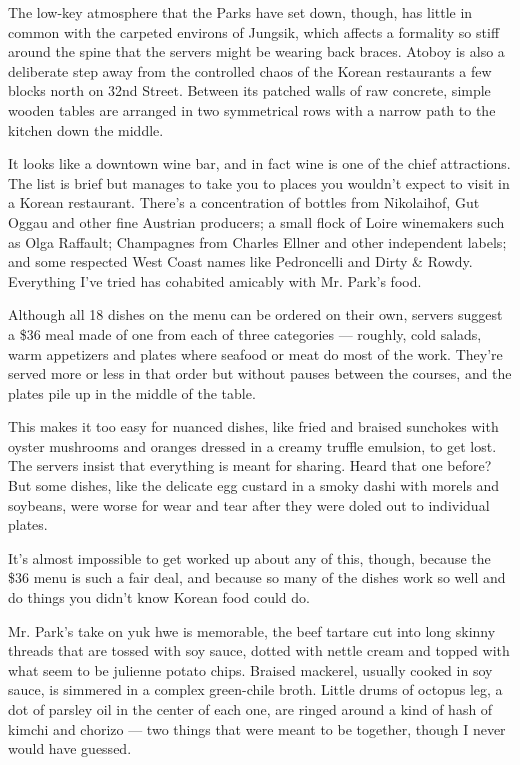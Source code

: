 The low-key atmosphere that the Parks have set down, though, has little
in common with the carpeted environs of Jungsik, which affects a
formality so stiff around the spine that the servers might be wearing
back braces. Atoboy is also a deliberate step away from the controlled
chaos of the Korean restaurants a few blocks north on 32nd Street.
Between its patched walls of raw concrete, simple wooden tables are
arranged in two symmetrical rows with a narrow path to the kitchen down
the middle.

It looks like a downtown wine bar, and in fact wine is one of the chief
attractions. The list is brief but manages to take you to places you
wouldn't expect to visit in a Korean restaurant. There's a concentration
of bottles from Nikolaihof, Gut Oggau and other fine Austrian producers;
a small flock of Loire winemakers such as Olga Raffault; Champagnes from
Charles Ellner and other independent labels; and some respected West
Coast names like Pedroncelli and Dirty \& Rowdy. Everything I've tried
has cohabited amicably with Mr. Park's food.

Although all 18 dishes on the menu can be ordered on their own, servers
suggest a \$36 meal made of one from each of three categories ---
roughly, cold salads, warm appetizers and plates where seafood or meat
do most of the work. They're served more or less in that order but
without pauses between the courses, and the plates pile up in the middle
of the table.

This makes it too easy for nuanced dishes, like fried and braised
sunchokes with oyster mushrooms and oranges dressed in a creamy truffle
emulsion, to get lost. The servers insist that everything is meant for
sharing. Heard that one before? But some dishes, like the delicate egg
custard in a smoky dashi with morels and soybeans, were worse for wear
and tear after they were doled out to individual plates.

It's almost impossible to get worked up about any of this, though,
because the \$36 menu is such a fair deal, and because so many of the
dishes work so well and do things you didn't know Korean food could do.

Mr. Park's take on yuk hwe is memorable, the beef tartare cut into long
skinny threads that are tossed with soy sauce, dotted with nettle cream
and topped with what seem to be julienne potato chips. Braised mackerel,
usually cooked in soy sauce, is simmered in a complex green-chile broth.
Little drums of octopus leg, a dot of parsley oil in the center of each
one, are ringed around a kind of hash of kimchi and chorizo --- two
things that were meant to be together, though I never would have
guessed.

